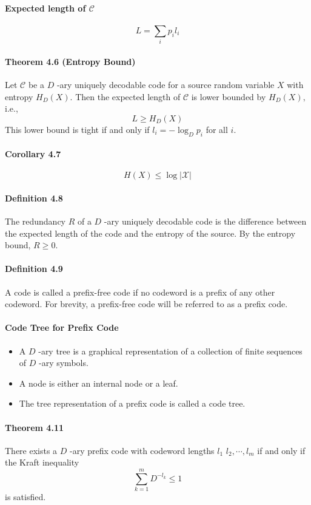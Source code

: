 \documentclass[8pt]{article}
\begin{document}
\paragraph{Expected length of $\mathcal{C}$}
$$
L=\sum_{i} p_{i} l_{i}
$$

\paragraph{Theorem 4.6 (Entropy Bound)} Let $\mathcal{C}$ be a $D$ -ary uniquely decodable code for a source random variable $X$ with entropy $H_{D}(X) .$ Then the expected length of $\mathcal{C}$ is lower bounded by $H_{D}(X),$ i.e.,
$$
L \geq H_{D}(X)
$$
This lower bound is tight if and only if $l_{i}=-\log _{D} p_{i}$ for all $i$.
\paragraph{Corollary 4.7} 
$$ H(X) \leq \log |\mathcal{X}| $$

\paragraph{Definition 4.8} The redundancy $R$ of a $D$ -ary uniquely decodable code is the difference between the expected length of the code and the entropy of the source.
By the entropy bound, $R \geq 0 .$

\paragraph{Definition 4.9} A code is called a prefix-free code if no codeword is a prefix of any other codeword. For brevity, a prefix-free code will be referred to as a prefix code.

\paragraph{Code Tree for Prefix Code}
\begin{itemize}
	\item A $D$ -ary tree is a graphical representation of a collection of finite sequences of $D$ -ary symbols.
	\item A node is either an internal node or a leaf.
	\item The tree representation of a prefix code is called a code tree.
\end{itemize}

\paragraph{Theorem 4.11} There exists a $D$ -ary prefix code with codeword lengths $l_{1}$ $l_{2}, \cdots, l_{m}$ if and only if the Kraft inequality
$$
\sum_{k=1}^{m} D^{-l_{k}} \leq 1
$$
is satisfied.
\end{document}
